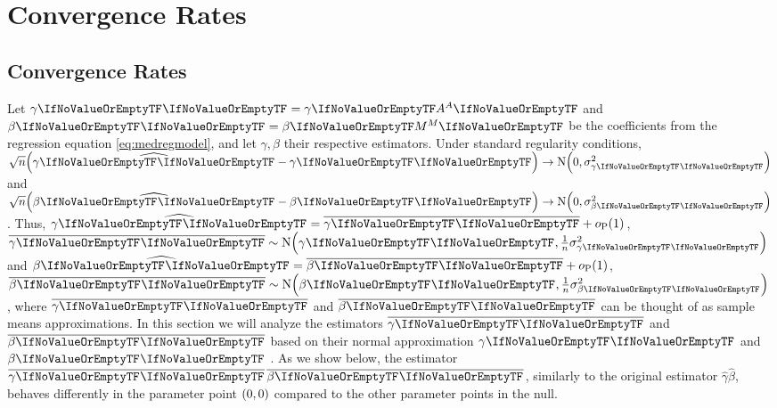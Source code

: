 \documentclass[ejs, twoside]{imsart}
\theoremstyle{plain}
\theoremstyle{remark}
\newcommand{\probasymleq}[1]{o_{\mathrm{P}}\left( #1 \right)}
\newcommand{\estim}[1]{\avg{\regcoef{#1}}}
\newcommand{\mle}[1]{\widehat{#1}}
\numberwithin{equation}{section}
\numberwithin{table}{section}
\numberwithin{figure}{section}
\let\originalleft\left
\let\originalright\right
\renewcommand{\left}{\mathopen{}\mathclose\bgroup\originalleft}
\renewcommand{\right}{\aftergroup\egroup\originalright}
\begin{document}
\section{Convergence Rates} \label{sec:rates}

\subsection{Convergence Rates} \label{sec:rates-general} \label{sec:rates-framework}

Let \(\regcoef{1} = \regcoef{1}[A]\) and \(\regcoef{2} = \regcoef{2}[M]\) be the coefficients from the regression equation \eqref{eq:medregmodel}, and let \(\gamma,\beta\) their respective estimators. %
Under standard regularity conditions, \(\sqrt{n}\left( \mle{\regcoef{1}} - \regcoef{1}\right) \to \nordist[0][\sigma^2_{\regcoef{1}}] \) and \(\sqrt{n}\left( \mle{\regcoef{2}} - \regcoef{2}\right) \to \nordist[0][\sigma^2_{\regcoef{2}}] \). Thus, \(\mle{\regcoef{1}} = \avg{\regcoef{1}} + \probasymleq{1}\), \(\estim{1} \sim \nordist[\regcoef{1}][\frac{1}{n} \sigma^2_{\regcoef{1}}]\) and \(\mle{\regcoef{2}}  = \avg{\regcoef{2}} + \probasymleq{1}\), \(\estim{2} \sim \nordist[\regcoef{2}][\frac{1}{n} \sigma^2_{\regcoef{2}}]\), where \(\avg{\regcoef{1}}\) and \(\avg{\regcoef{2}}\) can be thought of as sample means approximations. In this section we will analyze the estimators \(\estim{1}\) and \(\estim{2}\) based on their normal approximation \(\regcoef{1}\) and \(\regcoef{2}\) \citep[see also discussion in][]{huang_genome-wide_2019}.
As we show below, the estimator \(\product\), similarly to the original estimator \(\mle{\gamma} \mle{\beta}\), behaves differently in the parameter point \(\left(0,0 \right) \) compared to the other parameter points in the null.


\end{document}

